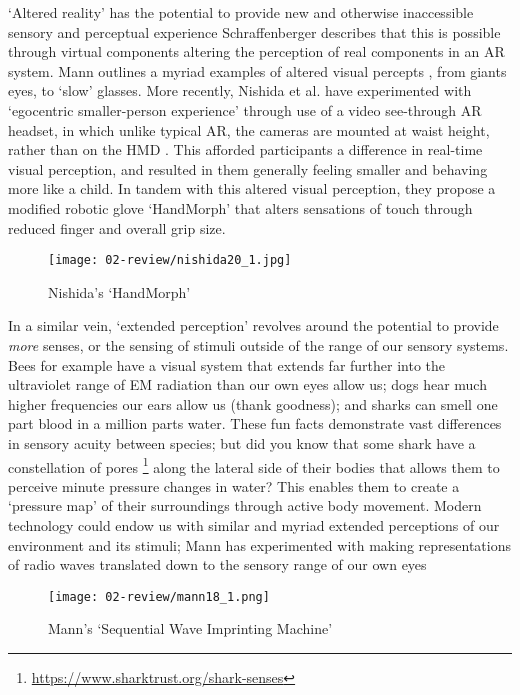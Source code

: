`Altered reality' has the potential to provide new and otherwise inaccessible sensory and perceptual experience Schraffenberger describes that this is possible through virtual components altering the perception of real components in an AR system. Mann outlines a myriad examples of altered visual percepts \citeyearpar{mann1994}, from giants eyes, to `slow' glasses. More recently, Nishida et al. have experimented with `egocentric smaller-person experience' through use of a video see-through AR headset, in which unlike typical AR, the cameras are mounted at waist height, rather than on the HMD \citeyearpar{nishida2019}. This afforded participants a difference in real-time visual perception, and resulted in them generally feeling smaller and behaving more like a child. In tandem with this altered visual perception, they propose a modified robotic glove `HandMorph' \citeyearpar{nishida2020} that alters sensations of touch through reduced finger and overall grip size. 

\begin{figure}[bth]
    \myfloatalign
    {\texttt{[image: 02-review/nishida20\_1.jpg]}}
    \caption[Nishida's `HandMorph']{Nishida's `HandMorph'}\label{fig: handmorph}
\end{figure}

In a similar vein, `extended perception' revolves around the potential to provide \textit{more} senses, or the sensing of stimuli outside of the range of our sensory systems. Bees for example have a visual system that extends far further into the ultraviolet range of EM radiation than our own eyes allow us; dogs hear much higher frequencies our ears allow us (thank goodness); and sharks can smell one part blood in a million parts water. These fun facts demonstrate vast differences in sensory acuity between species; but did you know that some shark have a constellation of pores \footnote{\url{https://www.sharktrust.org/shark-senses}} along the lateral side of their bodies that allows them to perceive minute pressure changes in water? This enables them to create a `pressure map' of their surroundings through active body movement. Modern technology could endow us with similar and myriad extended perceptions of our environment and its stimuli; Mann has experimented with making representations of radio waves translated down to the sensory range of our own eyes \citeyearpar{mann2018a}

\begin{figure}[bth]
    \myfloatalign
    {\texttt{[image: 02-review/mann18\_1.png]}}
    \caption[Mann's `Sequential Wave Imprinting Machine']{Mann's `Sequential Wave Imprinting Machine'}\label{fig: mann_swim}
\end{figure}


